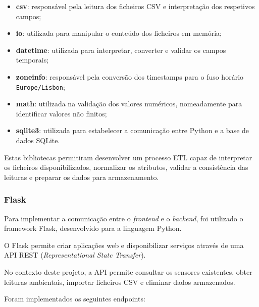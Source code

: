 \begin{itemize}

    \item \textbf{csv}: responsável pela leitura dos ficheiros
    CSV e interpretação dos respetivos campos;

    \item \textbf{io}: utilizada para manipular o conteúdo
    dos ficheiros em memória;

    \item \textbf{datetime}: utilizada para interpretar,
    converter e validar os campos temporais;

    \item \textbf{zoneinfo}: responsável pela conversão
    dos timestamps para o fuso horário
    \texttt{Europe/Lisbon};

    \item \textbf{math}: utilizada na validação dos valores
    numéricos, nomeadamente para identificar valores
    não finitos;

    \item \textbf{sqlite3}: utilizada para estabelecer
    a comunicação entre Python e a base de dados SQLite.

\end{itemize}

Estas bibliotecas permitiram desenvolver um processo ETL
capaz de interpretar os ficheiros disponibilizados,
normalizar os atributos, validar a consistência das
leituras e preparar os dados para armazenamento.


\subsubsection{Flask}

Para implementar a comunicação entre o
\textit{frontend} e o \textit{backend}, foi utilizado
o framework Flask, desenvolvido para a linguagem Python.

O Flask permite criar aplicações web e disponibilizar
serviços através de uma API REST
(\textit{Representational State Transfer}).

No contexto deste projeto, a API permite consultar
os sensores existentes, obter leituras ambientais,
importar ficheiros CSV e eliminar dados armazenados.

Foram implementados os seguintes endpoints:

